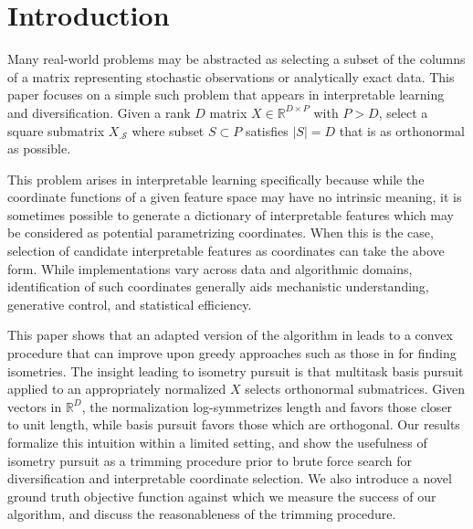 \section{Introduction}
\label{sec:introduction}

Many real-world problems may be abstracted as selecting a subset of the columns of a matrix representing stochastic observations or analytically exact data.
This paper focuses on a simple such problem that appears in interpretable learning and diversification.
Given a rank $D$ matrix $ X \in \mathbb R^{D \times P}$ with $P > D$, select a square submatrix $ X_{.\mathcal S}$ where subset $ S \subset P$ satisfies $| S| = D$ that is as orthonormal as possible.

This problem arises in interpretable learning specifically because while the coordinate functions of a given feature space may have no intrinsic meaning, it is sometimes possible to generate a dictionary of interpretable features which may be considered as potential parametrizing coordinates.
When this is the case, selection of candidate interpretable features as coordinates can take the above form.
While implementations vary across data and algorithmic domains, identification of such coordinates generally aids mechanistic understanding, generative control, and statistical efficiency.

This paper shows that an adapted version of the algorithm in \citet{Koelle2024-no} leads to a convex procedure that can improve upon greedy approaches such as those in \citet{5895106, NEURIPS2019_6a10bbd4, Kohli2021-lr, Jones2007-uc} for finding isometries.
The insight leading to isometry pursuit is that multitask basis pursuit applied to an appropriately normalized $ X$ selects orthonormal submatrices.
Given vectors in $\mathbb R^D$, the normalization log-symmetrizes length and favors those closer to unit length, while basis pursuit favors those which are orthogonal.
Our results formalize this intuition within a limited setting, and show the usefulness of isometry pursuit as a trimming procedure prior to brute force search for diversification and interpretable coordinate selection.
We also introduce a novel ground truth objective function against which we measure the success of our algorithm, and discuss the reasonableness of the trimming procedure.


